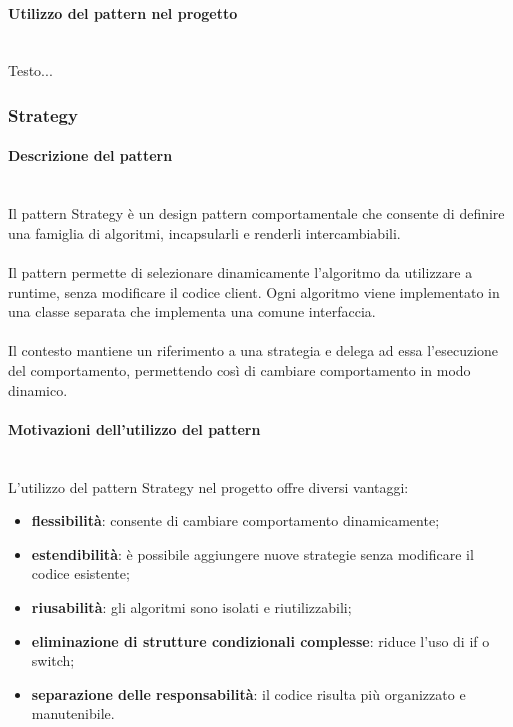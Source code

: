 \documentclass[a4paper,12pt]{article}
\begin{document}
{{{                \paragraph{ Utilizzo del pattern nel progetto}\mbox{}\\
                Testo...
            }
            \subsubsection{Strategy} {
                \paragraph{Descrizione del pattern}\mbox{}\\
                Il pattern Strategy è un design pattern comportamentale che consente di definire una famiglia di algoritmi, incapsularli e renderli intercambiabili.\\
                \\
                Il pattern permette di selezionare dinamicamente l’algoritmo da utilizzare a runtime, senza modificare il codice client. Ogni algoritmo viene implementato in una classe separata che implementa una comune interfaccia.\\
                \\
                Il contesto mantiene un riferimento a una strategia e delega ad essa l’esecuzione del comportamento, permettendo così di cambiare comportamento in modo dinamico.
                
                \paragraph{Motivazioni dell’utilizzo del pattern}\mbox{}\\
                L’utilizzo del pattern Strategy nel progetto offre diversi vantaggi:
                \begin{itemize}
                    \item \textbf{flessibilità}: consente di cambiare comportamento dinamicamente;
                    \item \textbf{estendibilità}: è possibile aggiungere nuove strategie senza modificare il codice esistente;
                    \item \textbf{riusabilità}: gli algoritmi sono isolati e riutilizzabili;
                    \item \textbf{eliminazione di strutture condizionali complesse}: riduce l’uso di if o switch;
                    \item \textbf{separazione delle responsabilità}: il codice risulta più organizzato e manutenibile.
                \end{itemize}
                
}}}
\end{document}
